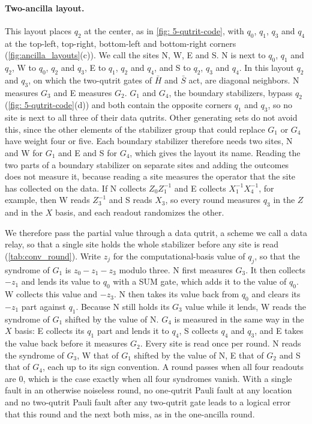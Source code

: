 \paragraph{Two-ancilla layout.} This layout places $q_2$ at the center, as in \autoref{fig: 5-qutrit-code}, with $q_0$, $q_1$, $q_3$ and $q_4$ at the top-left, top-right, bottom-left and bottom-right corners (\autoref{fig:ancilla_layouts}(c)). We call the sites N, W, E and S. N is next to $q_0$, $q_1$ and $q_2$, W to $q_0$, $q_2$ and $q_3$, E to $q_1$, $q_2$ and $q_4$, and S to $q_2$, $q_3$ and $q_4$. In this layout $q_2$ and $q_3$, on which the two-qutrit gates of $\bar H$ and $\bar S$ act, are diagonal neighbors. N measures $G_3$ and E measures $G_2$. $G_1$ and $G_4$, the boundary stabilizers, bypass $q_2$ (\autoref{fig: 5-qutrit-code}(d)) and both contain the opposite corners $q_1$ and $q_3$, so no site is next to all three of their data qutrits. Other generating sets do not avoid this, since the other elements of the stabilizer group that could replace $G_1$ or $G_4$ have weight four or five. Each boundary stabilizer therefore needs two sites, N and W for $G_1$ and E and S for $G_4$, which gives the layout its name. Reading the two parts of a boundary stabilizer on separate sites and adding the outcomes does not measure it, because reading a site measures the operator that the site has collected on the data. If N collects $Z_0 Z_1^{-1}$ and E collects $X_1^{-1} X_4^{-1}$, for example, then W reads $Z_3^{-1}$ and S reads $X_3$, so every round measures $q_3$ in the $Z$ and in the $X$ basis, and each readout randomizes the other.

We therefore pass the partial value through a data qutrit, a scheme we call a data relay, so that a single site holds the whole stabilizer before any site is read (\autoref{tab:conv_round}). Write $z_j$ for the computational-basis value of $q_j$, so that the syndrome of $G_1$ is $z_0 - z_1 - z_3$ modulo three. N first measures $G_3$. It then collects $-z_1$ and lends its value to $q_0$ with a SUM gate, which adds it to the value of $q_0$. W collects this value and $-z_3$. N then takes its value back from $q_0$ and clears its $-z_1$ part against $q_1$. Because N still holds its $G_3$ value while it lends, W reads the syndrome of $G_1$ shifted by the value of N. $G_4$ is measured in the same way in the $X$ basis: E collects its $q_1$ part and lends it to $q_4$, S collects $q_4$ and $q_3$, and E takes the value back before it measures $G_2$. Every site is read once per round. N reads the syndrome of $G_3$, W that of $G_1$ shifted by the value of N, E that of $G_2$ and S that of $G_4$, each up to its sign convention. A round passes when all four readouts are $0$, which is the case exactly when all four syndromes vanish. With a single fault in an otherwise noiseless round, no one-qutrit Pauli fault at any location and no two-qutrit Pauli fault after any two-qutrit gate leads to a logical error that this round and the next both miss, as in the one-ancilla round.

